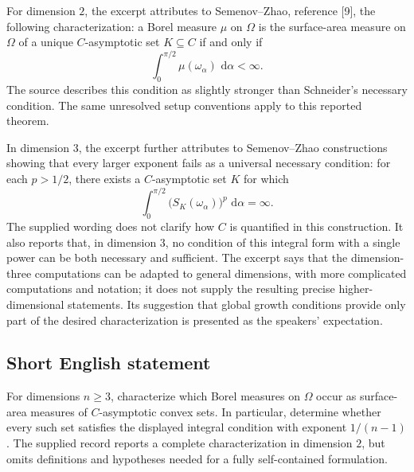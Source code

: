 \documentclass[11pt]{article}
\newcommand{\dd}{\,\mathrm{d}}
\begin{document}
For dimension \(2\), the excerpt attributes to Semenov--Zhao, reference [9], the following characterization: a Borel measure \(\mu\) on \(\Omega\) is the surface-area measure on \(\Omega\) of a unique \(C\)-asymptotic set \(K\subseteq C\) if and only if
\[
\int_0^{\pi/2}\mu(\omega_\alpha)\,\dd\alpha<\infty.
\]
The source describes this condition as slightly stronger than Schneider's necessary condition. The same unresolved setup conventions apply to this reported theorem.

In dimension \(3\), the excerpt further attributes to Semenov--Zhao constructions showing that every larger exponent fails as a universal necessary condition: for each \(p>1/2\), there exists a \(C\)-asymptotic set \(K\) for which
\[
\int_0^{\pi/2}\bigl(S_K(\omega_\alpha)\bigr)^p\,\dd\alpha=\infty.
\]
The supplied wording does not clarify how \(C\) is quantified in this construction. It also reports that, in dimension \(3\), no condition of this integral form with a single power can be both necessary and sufficient. The excerpt says that the dimension-three computations can be adapted to general dimensions, with more complicated computations and notation; it does not supply the resulting precise higher-dimensional statements. Its suggestion that global growth conditions provide only part of the desired characterization is presented as the speakers' expectation.
\subsection{Short English statement}
For dimensions \(n\geq3\), characterize which Borel measures on \(\Omega\) occur as surface-area measures of \(C\)-asymptotic convex sets. In particular, determine whether every such set satisfies the displayed integral condition with exponent \(1/(n-1)\). The supplied record reports a complete characterization in dimension \(2\), but omits definitions and hypotheses needed for a fully self-contained formulation.
\end{document}

